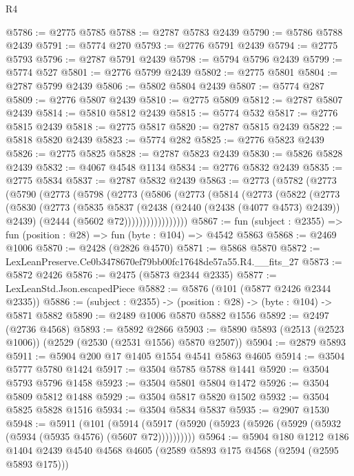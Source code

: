\begin{lexlean}{R4}
\begin{coremodule}
@5786 := @2775 @5785
@5788 := @2787 @5783 @2439
@5790 := @5786 @5788 @2439
@5791 := @5774 @270
@5793 := @2776 @5791 @2439
@5794 := @2775 @5793
@5796 := @2787 @5791 @2439
@5798 := @5794 @5796 @2439
@5799 := @5774 @527
@5801 := @2776 @5799 @2439
@5802 := @2775 @5801
@5804 := @2787 @5799 @2439
@5806 := @5802 @5804 @2439
@5807 := @5774 @287
@5809 := @2776 @5807 @2439
@5810 := @2775 @5809
@5812 := @2787 @5807 @2439
@5814 := @5810 @5812 @2439
@5815 := @5774 @532
@5817 := @2776 @5815 @2439
@5818 := @2775 @5817
@5820 := @2787 @5815 @2439
@5822 := @5818 @5820 @2439
@5823 := @5774 @282
@5825 := @2776 @5823 @2439
@5826 := @2775 @5825
@5828 := @2787 @5823 @2439
@5830 := @5826 @5828 @2439
@5832 := @4067 @4548 @1134
@5834 := @2776 @5832 @2439
@5835 := @2775 @5834
@5837 := @2787 @5832 @2439
@5863 := @2773
    (@5782
      (@2773
        (@5790
          (@2773
            (@5798
              (@2773
                (@5806
                  (@2773
                    (@5814
                      (@2773
                        (@5822
                          (@2773
                            (@5830
                              (@2773
                                (@5835
                                  @5837
                                  (@2438 (@2440 (@2438 (@4077 @4573) @2439)) @2439)
                                  (@2444 (@5602 @72)))))))))))))))))
@5867 := fun (subject : @2355) => fun (position : @28) => fun (byte : @104) => @4542 @5863
@5868 := @2469 @1006
@5870 := @2428 (@2826 @4570)
@5871 := @5868 @5870
@5872 := LexLeanPreserve.Ce0b3478670ef79bb00fc17648de57a55.R4.__fits_27
@5873 := @5872 @2426
@5876 := @2475 (@5873 @2344 @2335)
@5877 := LexLeanStd.Json.escapedPiece
@5882 := @5876 (@101 (@5877 @2426 @2344 @2335))
@5886 := (subject : @2355) -> (position : @28) -> (byte : @104) -> @5871 @5882
@5890 := @2489 @1006 @5870 @5882 @1556
@5892 := @2497 (@2736 @4568)
@5893 := @5892 @2866
@5903 := @5890 @5893 (@2513 (@2523 @1006)) (@2529 (@2530 (@2531 @1556) @5870 @2507))
@5904 := @2879 @5893
@5911 := @5904 @200 @17 @1405 @1554 @4541 @5863 @4605
@5914 := @3504 @5777 @5780 @1424
@5917 := @3504 @5785 @5788 @1441
@5920 := @3504 @5793 @5796 @1458
@5923 := @3504 @5801 @5804 @1472
@5926 := @3504 @5809 @5812 @1488
@5929 := @3504 @5817 @5820 @1502
@5932 := @3504 @5825 @5828 @1516
@5934 := @3504 @5834 @5837
@5935 := @2907 @1530
@5948 := @5911
    (@101 (@5914 (@5917 (@5920 (@5923 (@5926 (@5929 (@5932 (@5934 (@5935 @4576) (@5607 @72))))))))))
@5964 := @5904
    @180
    @1212
    @186
    @1404
    @2439
    @4540
    @4568
    @4605
    (@2589 @5893 @175 @4568 (@2594 (@2595 @5893 @175)))

\end{coremodule}
\end{lexlean}
